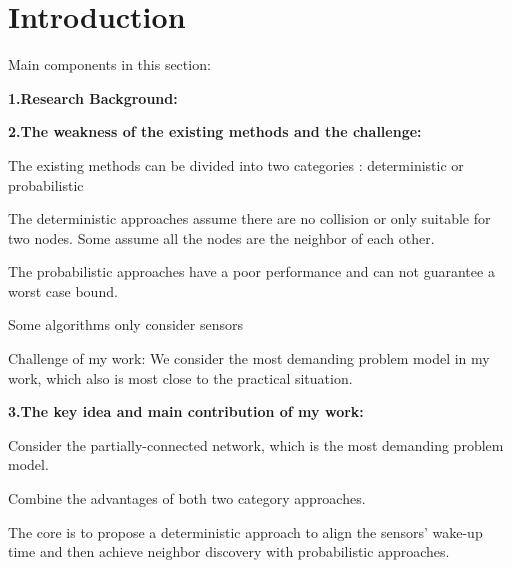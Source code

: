 \section{Introduction}

Main components in this section:

\textbf{1.Research Background:}

\textbf{2.The weakness of the existing methods and the challenge:}

The existing methods can be divided into two categories :  deterministic or probabilistic

The deterministic approaches assume there are no collision or only suitable for two nodes.
Some assume all the nodes are the neighbor of each other.

The probabilistic approaches have a poor performance and can not guarantee a worst case bound. 

Some algorithms only consider sensors   

Challenge of my work:
We consider the most demanding problem model in my work, which also is most close to the practical situation.

\textbf{3.The key idea and main contribution of my work:}

Consider the partially-connected network, which is the most demanding problem model.

Combine the advantages of both two category approaches.

The core is to propose a deterministic approach to  align the sensors' wake-up time and then achieve neighbor discovery with probabilistic approaches.




